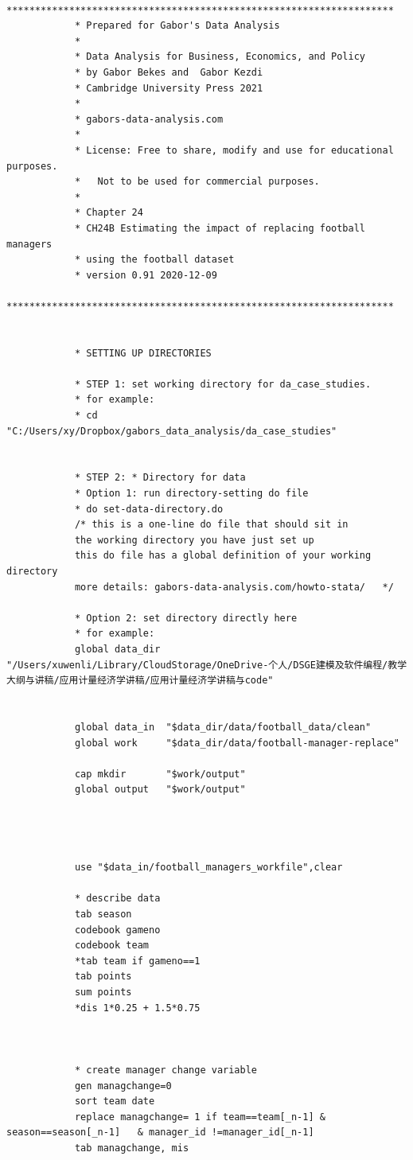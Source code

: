 \documentclass[cn,12pt,math=newtx,citestyle=gb7714-2015,bibstyle=gb7714-2015]{elegantbook}
\begin{document}
	    	\begin{lstlisting}
	    	********************************************************************
	    	* Prepared for Gabor's Data Analysis
	    	*
	    	* Data Analysis for Business, Economics, and Policy
	    	* by Gabor Bekes and  Gabor Kezdi
	    	* Cambridge University Press 2021
	    	*
	    	* gabors-data-analysis.com 
	    	*
	    	* License: Free to share, modify and use for educational purposes. 
	    	* 	Not to be used for commercial purposes.
	    	*
	    	* Chapter 24
	    	* CH24B Estimating the impact of replacing football managers
	    	* using the football dataset
	    	* version 0.91 2020-12-09
	    	********************************************************************
	    	
	    	
	    	* SETTING UP DIRECTORIES
	    	
	    	* STEP 1: set working directory for da_case_studies.
	    	* for example:
	    	* cd "C:/Users/xy/Dropbox/gabors_data_analysis/da_case_studies"
	    	
	    	
	    	* STEP 2: * Directory for data
	    	* Option 1: run directory-setting do file
	    	* do set-data-directory.do 
	    	/* this is a one-line do file that should sit in 
	    	the working directory you have just set up
	    	this do file has a global definition of your working directory
	    	more details: gabors-data-analysis.com/howto-stata/   */
	    	
	    	* Option 2: set directory directly here
	    	* for example:
	    	global data_dir "/Users/xuwenli/Library/CloudStorage/OneDrive-个人/DSGE建模及软件编程/教学大纲与讲稿/应用计量经济学讲稿/应用计量经济学讲稿与code"
	    	
	    	
	    	global data_in  "$data_dir/data/football_data/clean"
	    	global work  	"$data_dir/data/football-manager-replace"
	    	
	    	cap mkdir 		"$work/output"
	    	global output 	"$work/output"
	    	
	    	
	    	
	    	
	    	use "$data_in/football_managers_workfile",clear
	    	
	    	* describe data
	    	tab season
	    	codebook gameno
	    	codebook team
	    	*tab team if gameno==1
	    	tab points
	    	sum points
	    	*dis 1*0.25 + 1.5*0.75
	    	
	    	
	    	
	    	* create manager change variable
	    	gen managchange=0
	    	sort team date
	    	replace managchange= 1 if team==team[_n-1] & season==season[_n-1]   & manager_id !=manager_id[_n-1] 
	    	tab managchange, mis
	    	

\end{lstlisting}
\end{document}
